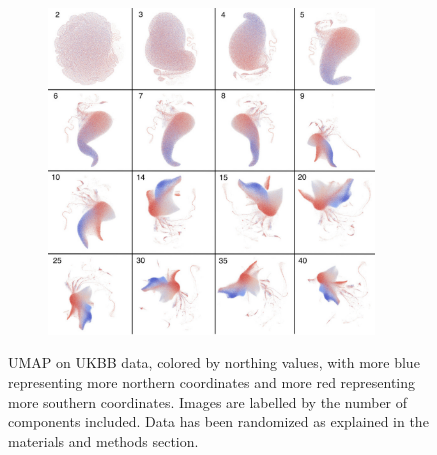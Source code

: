 \documentclass[12pt]{pnas-new}
\begin{document}
\begin{figure}
    \centering
    \begin{subfigure}{0.95\textwidth}
    \includegraphics[width=0.95\textwidth]{images/montage_ukbb_ns_pm.pdf}
    \end{subfigure}
    \caption{UMAP on UKBB data, colored by northing values, with more blue representing more northern coordinates and more red representing more southern coordinates. Images are labelled by the number of components included. Data has been randomized as explained in the materials and methods section.}
    \label{fig:supp_montage_ukbb_ns}
\end{figure}
\end{document}
